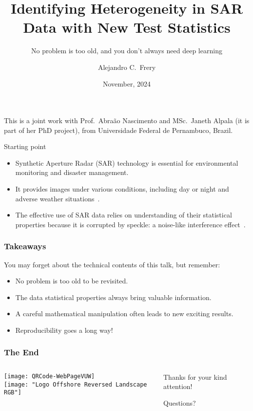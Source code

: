\documentclass[table,aspectratio=169]{beamer}
\title{Identifying Heterogeneity in SAR Data with New Test Statistics}
\subtitle{No problem is too old, and you don't always need deep learning}
\author{Alejandro C.\ Frery}
\institute{Victoria University of Wellington\\
	School of Mathematics and Statistics\\
	New Zealand}
\date{November, 2024}
\begin{document}
	
	\setsansfont[BoldFont={Avenir Heavy}]{Avenir Book}
	
	\frame{\titlepage}
	
	\begin{frame}
		This is a joint work with Prof.\ Abraão Nascimento and MSc.\ Janeth Alpala (it is part of her PhD project), from Universidade Federal de Pernambuco, Brazil.
	\end{frame}
	
	\begin{frame}{Starting point}
		\begin{itemize}[<+->]
			\item Synthetic Aperture Radar (SAR) technology is essential for environmental monitoring and disaster management. 
			\item It provides
			images under various conditions, including day or night and adverse weather
			situations~\citep{Moreira2013,Mu2019}. 
			\item The effective use of SAR
			data relies on understanding of their statistical properties
			because it is corrupted by speckle: a noise-like interference effect~\citep{Argenti2013}.
		\end{itemize}
	\end{frame}
	
	\begin{frame}[standout]
		\frametitle{Takeaways}
		You may forget about the technical contents of this talk, but remember:
		\begin{itemize}[<+->]
			\item No problem is too old to be revisited.
			\item The data statistical properties always bring valuable information.
			\item A careful mathematical manipulation often leads to new exciting results.
			\item Reproducibility goes a long way!
		\end{itemize}
	\end{frame}
	
	
	\begin{frame}
		
		 	
	\end{frame}
	
	\begin{frame}[standout]
		\frametitle{The End}
		\begin{columns}
			\begin{column}{.4\linewidth}
				\centering
				\texttt{[image: QRCode-WebPageVUW]}\\	\texttt{[image: "Logo Offshore Reversed Landscape RGB"]}
			\end{column}
			\begin{column}{.6\linewidth}
				Thanks for your kind attention!
				
				Questions?
			\end{column}
		\end{columns}
		
	\end{frame}
	
\end{document}
